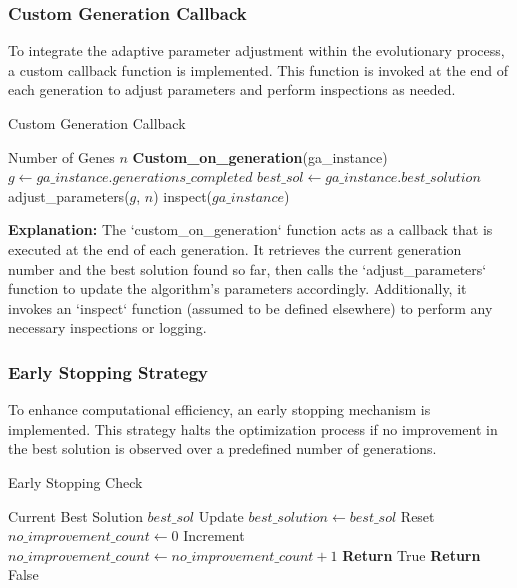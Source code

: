 \documentclass[conference]{IEEEtran}
\begin{document}
\subsubsection{Custom Generation Callback}

To integrate the adaptive parameter adjustment within the evolutionary process, a custom callback function is implemented. This function is invoked at the end of each generation to adjust parameters and perform inspections as needed.

\begin{algorithm}[H]
\caption{Custom Generation Callback}
\label{alg:custom_on_generation}
\begin{algorithmic}[1]
\REQUIRE Number of Genes $n$
\STATE \textbf{Custom\_on\_generation}(ga\_instance)
\STATE \quad $g \gets ga\_instance.generations\_completed$
\STATE \quad $best\_sol \gets ga\_instance.best\_solution$
\STATE \quad adjust\_parameters($g$, $n$)
\STATE \quad inspect($ga\_instance$)
\end{algorithmic}
\end{algorithm}

\textbf{Explanation:}  
The `custom\_on\_generation` function acts as a callback that is executed at the end of each generation. It retrieves the current generation number and the best solution found so far, then calls the `adjust\_parameters` function to update the algorithm's parameters accordingly. Additionally, it invokes an `inspect` function (assumed to be defined elsewhere) to perform any necessary inspections or logging.

\subsubsection{Early Stopping Strategy}

To enhance computational efficiency, an early stopping mechanism is implemented. This strategy halts the optimization process if no improvement in the best solution is observed over a predefined number of generations.

\begin{algorithm}[H]
\caption{Early Stopping Check}
\label{alg:check_early_stopping}
\begin{algorithmic}[1]
\REQUIRE Current Best Solution $best\_sol$
    \STATE Update $best\_solution \gets best\_sol$
    \STATE Reset $no\_improvement\_count \gets 0$
\ELSE
    \STATE Increment $no\_improvement\_count \gets no\_improvement\_count + 1$
\ENDIF
{}
    \STATE \textbf{Return} True 
\ELSE
    \STATE \textbf{Return} False
\ENDIF
\end{algorithmic}
\end{algorithm}
\end{document}
